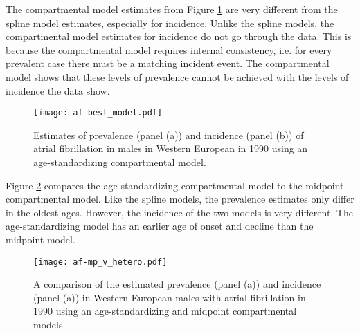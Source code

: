 The compartmental model estimates from Figure \ref{fig:app-af age-stand} 
are very different from the spline model estimates, especially for incidence.  
Unlike the spline models, the compartmental model estimates for 
incidence do not go through the data.  This is because the compartmental model 
requires internal consistency, i.e. for every prevalent case there must be 
a matching incident event.  The compartmental model shows that these levels 
of prevalence cannot be achieved with the levels of incidence the data show.

    \begin{figure}[h]
        \begin{center}
            \texttt{[image: af-best\_model.pdf]}
            \caption{Estimates of prevalence (panel (a)) and incidence (panel (b)) 
              of atrial fibrillation in males in Western European in 1990 using
              an age-standardizing compartmental model.}
            \label{fig:app-af age-stand}
        \end{center}
    \end{figure}

Figure \ref{fig:app-af compare} compares the age-standardizing compartmental 
model to the midpoint compartmental model.  Like the spline models, 
the prevalence estimates only differ in the oldest ages.  However, the 
incidence of the two models is very different.  The age-standardizing model 
has an earlier age of onset and decline than the midpoint model.

    \begin{figure}[h]
        \begin{center}
            \texttt{[image: af-mp\_v\_hetero.pdf]}
            \caption{A comparison of the estimated prevalence (panel (a)) and incidence (panel
              (a)) in Western European males with atrial fibrillation in 1990 using
              an age-standardizing and midpoint compartmental models.}
            \label{fig:app-af compare}
        \end{center}
    \end{figure}
    
